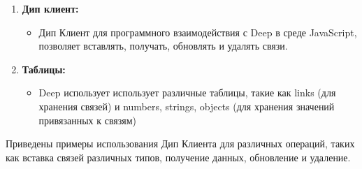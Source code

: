 \begin{enumerate}
  \item \textbf{Дип клиент:}
        \begin{itemize}
          \item Дип Клиент для программного взаимодействия с Deep в
                среде
                JavaScript, позволяет вставлять, получать, обновлять и
                удалять
                связи.
        \end{itemize}

  \item \textbf{Таблицы:}
        \begin{itemize}
          \item Deep использует использует различные таблицы, такие как
                links
                (для хранения связей) и numbers, strings, objects (для
                хранения
                значений
                привязанных к связям)
        \end{itemize}
\end{enumerate}

Приведены примеры использования Дип Клиента для различных операций, таких как
вставка связей различных типов, получение данных, обновление и удаление.


\tableofcontents